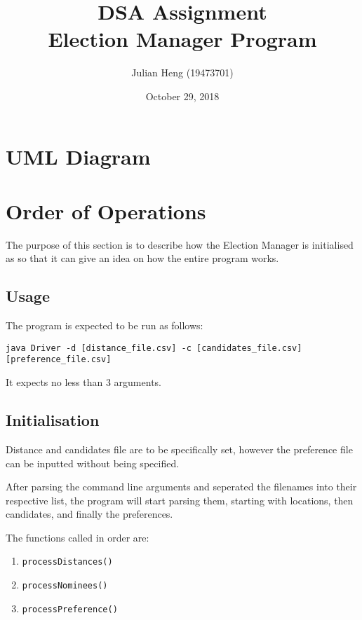 \documentclass[a4paper, 12pt, titlepage]{article}
\title{\huge \textbf{DSA Assignment\\Election Manager Program}}
\author{Julian Heng (19473701)}
\date{October 29, 2018}
\newcommand{\code}[1]{\small\texttt{#1}\normalsize}
\begin{document}
\maketitle
\tableofcontents
\newpage

\pagestyle{fancy}

\fancyhf[FC]{\thepage}

\section{UML Diagram}

\newpage

\section{Order of Operations}

The purpose of this section is to describe how the Election Manager is
initialised as so that it can give an idea on how the entire program works.

\subsection{Usage}
The program is expected to be run as follows:

\code{java Driver -d [distance\_file.csv]
-c [candidates\_file.csv] [preference\_file.csv]}

It expects no less than 3 arguments.

\subsection{Initialisation}
Distance and candidates file are to be specifically set, however the
preference file can be inputted without being specified.

After parsing the command line arguments and seperated the filenames
into their respective list, the program will start parsing them, starting
with locations, then candidates, and finally the preferences.

The functions called in order are:
\begin{enumerate}
    \item \code{processDistances()}
    \item \code{processNominees()}
    \item \code{processPreference()}
\end{enumerate}
\end{document}
